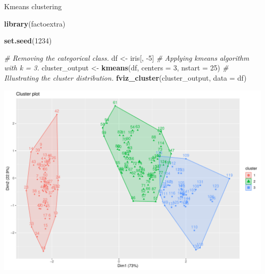 \documentclass[12pt,ignorenonframetext,]{beamer}
\newenvironment{Shaded}{\begin{snugshade}}{\end{snugshade}}
\newcommand{\CommentTok}[1]{\textcolor[rgb]{0.56,0.35,0.01}{\textit{#1}}}
\newcommand{\DataTypeTok}[1]{\textcolor[rgb]{0.13,0.29,0.53}{#1}}
\newcommand{\DecValTok}[1]{\textcolor[rgb]{0.00,0.00,0.81}{#1}}
\newcommand{\KeywordTok}[1]{\textcolor[rgb]{0.13,0.29,0.53}{\textbf{#1}}}
\newcommand{\NormalTok}[1]{#1}
\newcommand{\StringTok}[1]{\textcolor[rgb]{0.31,0.60,0.02}{#1}}
\begin{document}
\begin{frame}[fragile]{Kmeans clustering}
\protect\hypertarget{kmeans-clustering}{}

\tiny

\begin{Shaded}
\begin{Highlighting}[]
\KeywordTok{library}\NormalTok{(factoextra)}

\KeywordTok{set.seed}\NormalTok{(}\DecValTok{1234}\NormalTok{)}

\CommentTok{# Removing the categorical class.}
\NormalTok{df <-}\StringTok{ }\NormalTok{iris[, }\DecValTok{-5}\NormalTok{]}
\CommentTok{# Applying kmeans algorithm with k = 3.}
\NormalTok{cluster_output <-}\StringTok{ }\KeywordTok{kmeans}\NormalTok{(df, }\DataTypeTok{centers =} \DecValTok{3}\NormalTok{, }\DataTypeTok{nstart =} \DecValTok{25}\NormalTok{)}
\CommentTok{# Illustrating the cluster distribution.}
\KeywordTok{fviz_cluster}\NormalTok{(cluster_output, }\DataTypeTok{data =}\NormalTok{ df)}
\end{Highlighting}
\end{Shaded}

\begin{center}\includegraphics[width=0.6\linewidth,height=0.5\textheight]{figs/unnamed-chunk-15} \end{center}

\normalsize

\end{frame}
\end{document}
